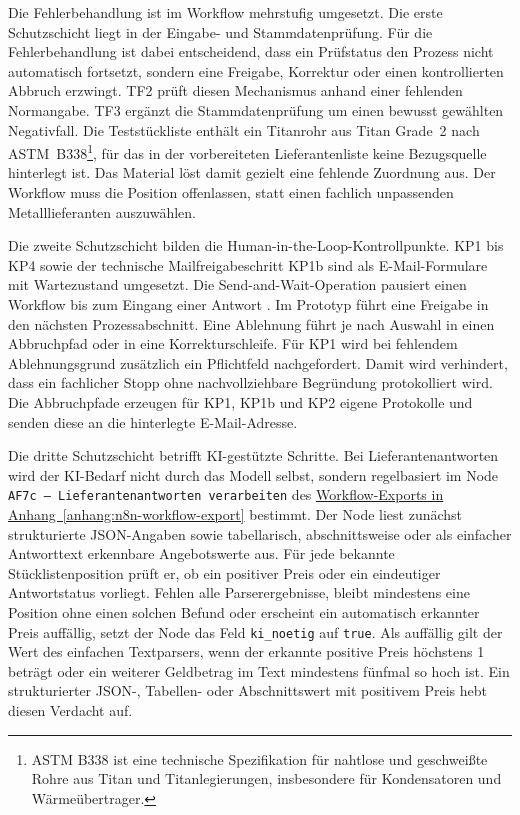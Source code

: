 \documentclass[a4paper,12pt]{article}
\begin{document}
Die Fehlerbehandlung ist im Workflow mehrstufig umgesetzt. Die erste Schutzschicht liegt in der Eingabe- und Stammdatenprüfung. Für die Fehlerbehandlung ist dabei entscheidend, dass ein Prüfstatus den Prozess nicht automatisch fortsetzt, sondern eine Freigabe, Korrektur oder einen kontrollierten Abbruch erzwingt. TF2 prüft diesen Mechanismus anhand einer fehlenden Normangabe. TF3 ergänzt die Stammdatenprüfung um einen bewusst gewählten Negativfall. Die Teststückliste enthält ein Titanrohr aus Titan Grade~2 nach ASTM~B338\footnote{ASTM B338 ist eine technische Spezifikation für nahtlose und geschweißte Rohre aus Titan und Titanlegierungen, insbesondere für Kondensatoren und Wärmeübertrager.}, für das in der vorbereiteten Lieferantenliste keine Bezugsquelle hinterlegt ist. Das Material löst damit gezielt eine fehlende Zuordnung aus. Der Workflow muss die Position offenlassen, statt einen fachlich unpassenden Metalllieferanten auszuwählen.

Die zweite Schutzschicht bilden die Human-in-the-Loop-Kontrollpunkte. KP1 bis KP4 sowie der technische Mailfreigabeschritt KP1b sind als E-Mail-Formulare mit Wartezustand umgesetzt. Die Send-and-Wait-Operation pausiert einen Workflow bis zum Eingang einer Antwort \parencite{n8n_docs_2026}. Im Prototyp führt eine Freigabe in den nächsten Prozessabschnitt. Eine Ablehnung führt je nach Auswahl in einen Abbruchpfad oder in eine Korrekturschleife. Für KP1 wird bei fehlendem Ablehnungsgrund zusätzlich ein Pflichtfeld nachgefordert. Damit wird verhindert, dass ein fachlicher Stopp ohne nachvollziehbare Begründung protokolliert wird. Die Abbruchpfade erzeugen für KP1, KP1b und KP2 eigene Protokolle und senden diese an die hinterlegte E-Mail-Adresse.

Die dritte Schutzschicht betrifft KI-gestützte Schritte. Bei Lieferantenantworten wird der KI-Bedarf nicht durch das Modell selbst, sondern regelbasiert im Node \texttt{AF7c -- Lieferantenantworten verarbeiten} des \hyperref[anhang:n8n-workflow-export]{Workflow-Exports in Anhang~\ref*{anhang:n8n-workflow-export}} bestimmt. Der Node liest zunächst strukturierte JSON-Angaben sowie tabellarisch, abschnittsweise oder als einfacher Antworttext erkennbare Angebotswerte aus. Für jede bekannte Stücklistenposition prüft er, ob ein positiver Preis oder ein eindeutiger Antwortstatus vorliegt. Fehlen alle Parserergebnisse, bleibt mindestens eine Position ohne einen solchen Befund oder erscheint ein automatisch erkannter Preis auffällig, setzt der Node das Feld \texttt{ki\_noetig} auf \texttt{true}. Als auffällig gilt der Wert des einfachen Textparsers, wenn der erkannte positive Preis höchstens 1 beträgt oder ein weiterer Geldbetrag im Text mindestens fünfmal so hoch ist. Ein strukturierter JSON-, Tabellen- oder Abschnittswert mit positivem Preis hebt diesen Verdacht auf.
\end{document}
